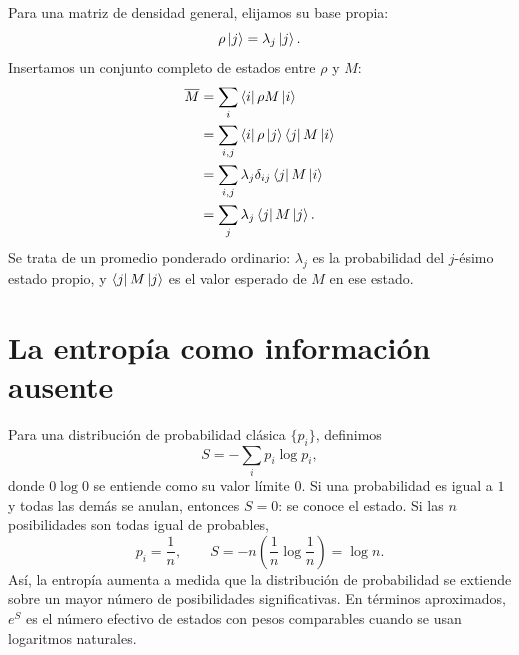 Para una matriz de densidad general, elijamos su base propia:
\begin{equation}
\rho\left\lvert j\right\rangle=\lambda_j\left\lvert j\right\rangle.
\end{equation}
Insertamos un conjunto completo de estados entre \(\rho\) y \(M\):
\begin{align}
\overline{M}
&=\sum_i\left\langle i\right\rvert\rho M\left\lvert i\right\rangle \\
&=\sum_{i,j}\left\langle i\right\rvert\rho\left\lvert j\right\rangle\left\langle j\right\rvert M\left\lvert i\right\rangle \\
&=\sum_{i,j}\lambda_j\delta_{ij}\left\langle j\right\rvert M\left\lvert i\right\rangle \\
&=\sum_j\lambda_j\left\langle j\right\rvert M\left\lvert j\right\rangle.
\end{align}
Se trata de un promedio ponderado ordinario: \(\lambda_j\) es la probabilidad del \(j\)-ésimo estado propio, y \(\left\langle j\right\rvert M\left\lvert j\right\rangle\) es el valor esperado de \(M\) en ese estado.

\begin{classroomqa}
\end{classroomqa}

\section{La entropía como información ausente}

Para una distribución de probabilidad clásica \(\{p_i\}\), definimos
\begin{equation}
S=-\sum_i p_i\log p_i,
\end{equation}
donde \(0\log 0\) se entiende como su valor límite \(0\). Si una probabilidad es igual a \(1\) y todas las demás se anulan, entonces \(S=0\): se conoce el estado. Si las \(n\) posibilidades son todas igual de probables,
\begin{equation}
p_i=\frac{1}{n},
\qquad
S=-n\left(\frac{1}{n}\log\frac{1}{n}\right)=\log n.
\end{equation}
Así, la entropía aumenta a medida que la distribución de probabilidad se extiende sobre un mayor número de posibilidades significativas. En términos aproximados, \(e^S\) es el número efectivo de estados con pesos comparables cuando se usan logaritmos naturales.

